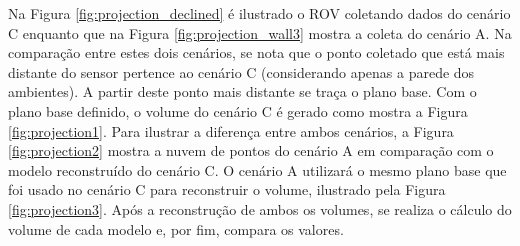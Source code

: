 Na Figura \ref{fig:projection_declined} é ilustrado o ROV coletando dados do cenário C enquanto que na Figura \ref{fig:projection_wall3} mostra a coleta do cenário A.
Na comparação entre estes dois cenários, se nota que o ponto coletado que está mais distante do sensor pertence ao cenário C (considerando apenas a parede dos ambientes).
A partir deste ponto mais distante se traça o plano base.
Com o plano base definido, o volume do cenário C é gerado como mostra a Figura \ref{fig:projection1}.
Para ilustrar a diferença entre ambos cenários, a Figura \ref{fig:projection2} mostra a nuvem de pontos do cenário A em comparação com o modelo reconstruído do cenário C.
O cenário A utilizará o mesmo plano base que foi usado no cenário C para reconstruir o volume, ilustrado pela Figura \ref{fig:projection3}.
Após a reconstrução de ambos os volumes, se realiza o cálculo do volume de cada modelo e, por fim, compara os valores.

